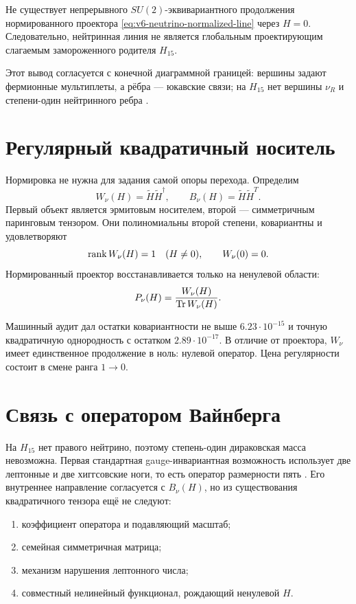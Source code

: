 \begin{theorem}
Не существует непрерывного $SU(2)$-эквивариантного продолжения
нормированного проектора \eqref{eq:v6-neutrino-normalized-line} через
$H=0$. Следовательно, нейтринная линия не является глобальным
проектирующим слагаемым замороженного родителя $H_{15}$.
\end{theorem}

Этот вывод согласуется с конечной диаграммной границей: вершины задают
фермионные мультиплеты, а рёбра --- юкавские связи; на $H_{15}$ нет
вершины $\nu_R$ и степени-один нейтринного ребра
\cite{neutrino-parent-krajewski1998,
neutrino-parent-chamseddine-connes-marcolli2007}.

\section{Регулярный квадратичный носитель}

Нормировка не нужна для задания самой опоры перехода. Определим
\begin{equation}
 W_\nu(H)=\widetilde H\widetilde H^\dagger,
 \qquad
 B_\nu(H)=\widetilde H\widetilde H^T.
 \label{eq:v6-neutrino-unnormalized-parent}
\end{equation}
Первый объект является эрмитовым носителем, второй --- симметричным
паринговым тензором. Они полиномиальны второй степени, ковариантны и
удовлетворяют
\begin{equation}
 \operatorname{rank} W_\nu(H)=1\quad(H\ne0),
 \qquad W_\nu(0)=0.
\end{equation}
Нормированный проектор восстанавливается только на ненулевой области:
\begin{equation}
 P_\nu(H)=\frac{W_\nu(H)}{\operatorname{Tr} W_\nu(H)}.
\end{equation}

Машинный аудит дал остатки ковариантности не выше
$6.23\cdot10^{-15}$ и точную квадратичную однородность с остатком
$2.89\cdot10^{-17}$. В отличие от проектора, $W_\nu$ имеет единственное
продолжение в ноль: нулевой оператор. Цена регулярности состоит в смене
ранга $1\to0$.

\section{Связь с оператором Вайнберга}

На $H_{15}$ нет правого нейтрино, поэтому степень-один дираковская масса
невозможна. Первая стандартная gauge-инвариантная возможность использует
две лептонные и две хиггсовские ноги, то есть оператор размерности пять
\cite{neutrino-parent-weinberg1979}. Его внутреннее направление
согласуется с $B_\nu(H)$, но из существования квадратичного тензора ещё
не следуют:
\begin{enumerate}
 \item коэффициент оператора и подавляющий масштаб;
 \item семейная симметричная матрица;
 \item механизм нарушения лептонного числа;
 \item совместный нелинейный функционал, рождающий ненулевой $H$.
\end{enumerate}

